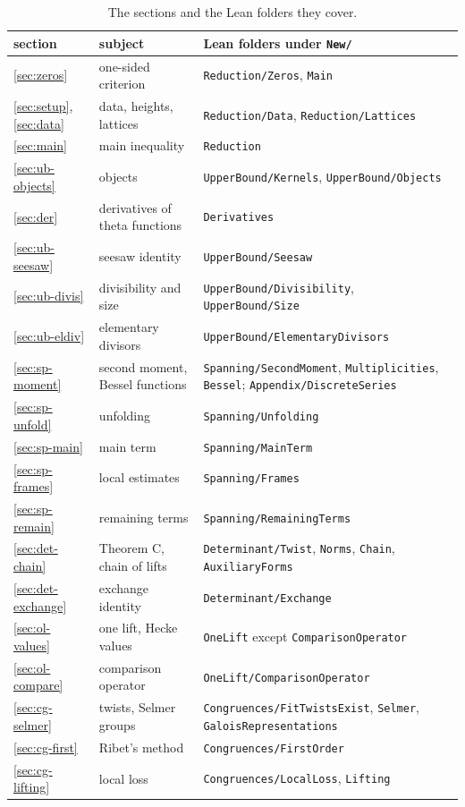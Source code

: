 \begin{table}[ht]
\centering
\small
\begin{tabular}{llp{7.9cm}}
\toprule
section & subject & Lean folders under \texttt{New/} \\
\midrule
\ref{sec:zeros} & one-sided criterion & \texttt{Reduction/Zeros}, \texttt{Main} \\
\ref{sec:setup}, \ref{sec:data} & data, heights, lattices & \texttt{Reduction/Data}, \texttt{Reduction/Lattices} \\
\ref{sec:main} & main inequality & \texttt{Reduction} \\
\midrule
\ref{sec:ub-objects} & objects & \texttt{UpperBound/Kernels}, \texttt{UpperBound/Objects} \\
\ref{sec:der} & derivatives of theta functions & \texttt{Derivatives} \\
\ref{sec:ub-seesaw} & seesaw identity & \texttt{UpperBound/Seesaw} \\
\ref{sec:ub-divis} & divisibility and size & \texttt{UpperBound/Divisibility}, \texttt{UpperBound/Size} \\
\ref{sec:ub-eldiv} & elementary divisors & \texttt{UpperBound/ElementaryDivisors} \\
\midrule
\ref{sec:sp-moment} & second moment, Bessel functions & \texttt{Spanning/SecondMoment}, \texttt{Multiplicities}, \texttt{Bessel}; \texttt{Appendix/DiscreteSeries} \\
\ref{sec:sp-unfold} & unfolding & \texttt{Spanning/Unfolding} \\
\ref{sec:sp-main} & main term & \texttt{Spanning/MainTerm} \\
\ref{sec:sp-frames} & local estimates & \texttt{Spanning/Frames} \\
\ref{sec:sp-remain} & remaining terms & \texttt{Spanning/RemainingTerms} \\
\midrule
\ref{sec:det-chain} & Theorem C, chain of lifts & \texttt{Determinant/Twist}, \texttt{Norms}, \texttt{Chain}, \texttt{AuxiliaryForms} \\
\ref{sec:det-exchange} & exchange identity & \texttt{Determinant/Exchange} \\
\ref{sec:ol-values} & one lift, Hecke values & \texttt{OneLift} except \texttt{ComparisonOperator} \\
\ref{sec:ol-compare} & comparison operator & \texttt{OneLift/ComparisonOperator} \\
\ref{sec:cg-selmer} & twists, Selmer groups & \texttt{Congruences/FitTwistsExist}, \texttt{Selmer}, \texttt{GaloisRepresentations} \\
\ref{sec:cg-first} & Ribet's method & \texttt{Congruences/FirstOrder} \\
\ref{sec:cg-lifting} & local loss & \texttt{Congruences/LocalLoss}, \texttt{Lifting} \\
\bottomrule
\end{tabular}
\caption{The sections and the Lean folders they cover.}
\label{intro:tab:parts}
\end{table}

